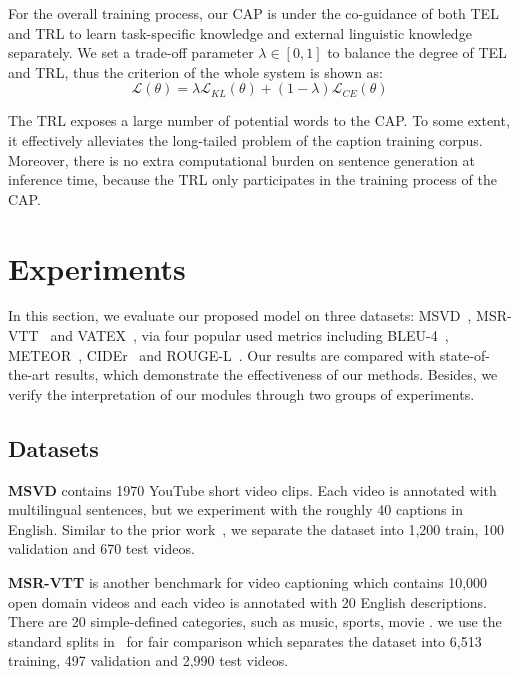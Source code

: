 \documentclass[10pt,twocolumn,letterpaper]{article}
\begin{document}
For the overall training process, our CAP is under the co-guidance of both TEL and TRL to learn task-specific knowledge and external linguistic knowledge separately. We set a trade-off parameter $\lambda \in [0,1]$ to balance the degree of TEL and TRL, thus the criterion of the whole system is shown as:
\begin{equation}\label{key}
\mathcal{L}(\theta) = \lambda \mathcal{L}_{KL}(\theta) + (1-\lambda)\mathcal{L}_{CE}(\theta)
\end{equation}

The TRL exposes a large number of potential words to the CAP. To some extent, it effectively alleviates the long-tailed problem of the caption training corpus. Moreover, there is no extra computational burden on sentence generation at inference time, because the TRL only participates in the training process of the CAP. 




\section{Experiments}
In this section, we evaluate our proposed model on three datasets: MSVD~\cite{Chen2011}, MSR-VTT~\cite{Xu2016} and VATEX~\cite{Wang2019}, via four popular used metrics including BLEU-4~\cite{Papineni2002}, METEOR~\cite{Denkowski2014}, CIDEr~\cite{Vedantam2015} and ROUGE-L~\cite{Lin2004}. Our results are compared with state-of-the-art results, which demonstrate the effectiveness of our methods. Besides, we verify the interpretation of our modules through two groups of experiments.


\subsection{Datasets}
\textbf{MSVD} contains 1970 YouTube short video clips. Each video is annotated with multilingual sentences, but we experiment with the roughly 40 captions in English. Similar to the prior work~\cite{Venugopalan2015b}, we separate the dataset into 1,200 train, 100 validation and 670 test videos.

\textbf{MSR-VTT} is another benchmark for video captioning which contains 10,000 open domain videos and each video is annotated with 20 English descriptions. There are 20 simple-defined categories, such as music, sports, movie \etc. we use the standard splits in~\cite{Xu2016} for fair comparison which separates the dataset into 6,513 training, 497 validation and 2,990 test videos.
\end{document}
